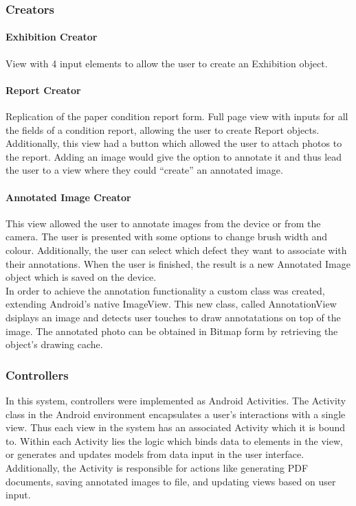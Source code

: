 \documentclass[12pt]{article}
\begin{document}
\subsubsection{Creators}
\label{sec:creators}

\paragraph{Exhibition Creator}
View with 4 input elements to allow the user to create an Exhibition object.

\paragraph{Report Creator}
Replication of the paper condition report form. Full page view with inputs for all the fields of a condition report, allowing the user to create Report objects. Additionally, this view had a button which allowed the user to attach photos to the report. Adding an image would give the option to annotate it and thus lead the user to a view where they could ``create'' an annotated image.

\paragraph{Annotated Image Creator}
This view allowed the user to annotate images from the device or from the camera. The user is presented with some options to change brush width and colour. Additionally, the user can select which defect they want to associate with their annotations. When the user is finished, the result is a new Annotated Image object which is saved on the device. \\

In order to achieve the annotation functionality a custom class was created, extending Android's native ImageView. This new class, called AnnotationView dsiplays an image and detects user touches to draw annotatations on top of the image. The annotated photo can be obtained in Bitmap form by retrieving the object's drawing cache. 

\subsubsection{Controllers}
\label{sec:Controllers}

In this system, controllers were implemented as Android Activities. The Activity class in the Android environment encapsulates a user's interactions with a single view. Thus each view in the system has an associated Activity which it is bound to. Within each Activity lies the logic which binds data to elements in the view, or generates and updates models from data input in the user interface. Additionally, the Activity is responsible for actions like generating PDF documents, saving annotated images to file, and updating views based on user input. 
\end{document}
